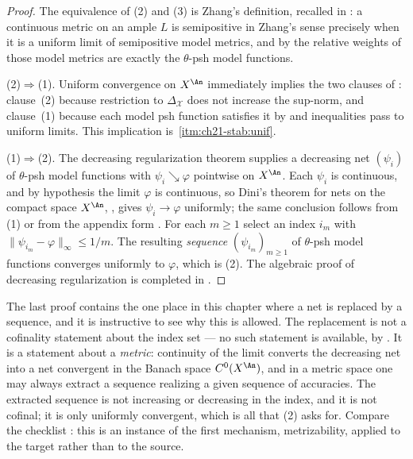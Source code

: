 \begin{proof}
The equivalence of (2) and (3) is Zhang's definition, recalled in
: a continuous metric on an ample \(L\) is
semipositive in Zhang's sense precisely when it is a uniform limit of
semipositive model metrics, and by
 the relative weights of those model
metrics are exactly the \(\theta\)-psh model functions.

(2)\(\Rightarrow\)(1).  Uniform convergence on \(X^{\An}\)
immediately implies the two clauses of : clause~(2)
because restriction to \(\Delta_{\mathcal X}\) does not increase the
sup-norm, and clause~(1) because each model psh function satisfies it by
 and inequalities pass to uniform
limits.  This implication is
\,\cref{itm:ch21-stab:unif}.

(1)\(\Rightarrow\)(2).  The decreasing regularization theorem
 supplies a decreasing net
\((\psi_i)\) of \(\theta\)-psh model functions with
\(\psi_i\searrow\varphi\) pointwise on \(X^{\An}\).  Each \(\psi_i\) is
continuous, and by hypothesis the limit \(\varphi\) is continuous, so
Dini's theorem for nets on the compact space
\(X^{\An}\), , gives \(\psi_i\to\varphi\) uniformly;
the same conclusion follows from \,(1) or from the
appendix form .  For each \(m\geq1\) select an index
\(i_m\) with \(\lVert\psi_{i_m}-\varphi\rVert_\infty\leq1/m\).  The
resulting \emph{sequence} \((\psi_{i_m})_{m\geq1}\) of \(\theta\)-psh model
functions converges uniformly to \(\varphi\), which is (2).  The algebraic
proof of decreasing regularization is completed in
.
\end{proof}

\begin{remark}
\label{rem:ch21-net-to-sequence}
The last proof contains the one place in this chapter where a net is
replaced by a sequence, and it is instructive to see why this is allowed.
The replacement is not a cofinality statement about the index set --- no
such statement is available, by .  It is
a statement about a \emph{metric}: continuity of the limit converts the
decreasing net into a net convergent in the Banach space
\(C^0(X^{\An})\), and in a metric space one may always extract a sequence
realizing a given sequence of accuracies.  The extracted sequence is not
increasing or decreasing in the index, and it is not cofinal; it is only
uniformly convergent, which is all that (2) asks for.  Compare the
checklist : this is an instance of the
first mechanism, metrizability, applied to the target rather than to the
source.
\end{remark}

